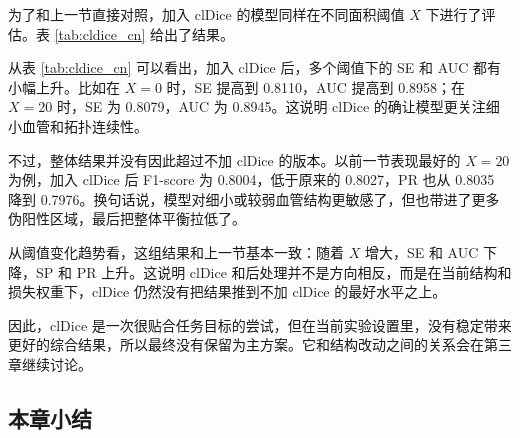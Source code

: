 \documentclass[a4paper,12pt]{article}
\begin{document}
为了和上一节直接对照，加入 clDice 的模型同样在不同面积阈值 \(X\) 下进行了评估。表 \ref{tab:cldice_cn} 给出了结果。

\begin{table}[htbp]
\centering
\caption{加入 clDice 后在不同后处理阈值下的结果对比}
\label{tab:cldice_cn}
\end{table}

从表 \ref{tab:cldice_cn} 可以看出，加入 clDice 后，多个阈值下的 SE 和 AUC 都有小幅上升。比如在 \(X=0\) 时，SE 提高到 0.8110，AUC 提高到 0.8958；在 \(X=20\) 时，SE 为 0.8079，AUC 为 0.8945。这说明 clDice 的确让模型更关注细小血管和拓扑连续性。

不过，整体结果并没有因此超过不加 clDice 的版本。以前一节表现最好的 \(X=20\) 为例，加入 clDice 后 F1-score 为 0.8004，低于原来的 0.8027，PR 也从 0.8035 降到 0.7976。换句话说，模型对细小或较弱血管结构更敏感了，但也带进了更多伪阳性区域，最后把整体平衡拉低了。

从阈值变化趋势看，这组结果和上一节基本一致：随着 \(X\) 增大，SE 和 AUC 下降，SP 和 PR 上升。这说明 clDice 和后处理并不是方向相反，而是在当前结构和损失权重下，clDice 仍然没有把结果推到不加 clDice 的最好水平之上。

因此，clDice 是一次很贴合任务目标的尝试，但在当前实验设置里，没有稳定带来更好的综合结果，所以最终没有保留为主方案。它和结构改动之间的关系会在第三章继续讨论。

\subsection{本章小结}
\end{document}
